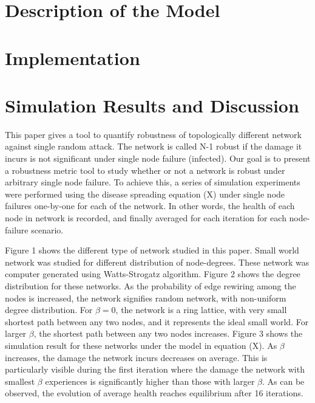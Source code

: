 \documentclass[11pt]{article}
\begin{document}
\section{Description of the Model}

\section{Implementation}

\newpage
\section{Simulation Results and Discussion}
This paper gives a tool to quantify robustness of topologically different network against single random attack. The network is called N-1 robust if the damage it incurs is not significant under single node failure (infected). Our goal is to present a robustness metric tool to study whether or not a network is robust under arbitrary single node failure. To achieve this, a series of simulation experiments were performed using the disease spreading equation (X) under single node failures one-by-one for each of the network. In other words, the health of each node in network is recorded, and finally averaged for each iteration for each node-failure scenario. 

Figure 1 shows the different type of network studied in this paper. Small world network was studied for different distribution of node-degrees. These network was computer generated using Watts-Strogatz algorithm. Figure 2 shows the degree distribution for these networks. As the probability of edge rewiring among the nodes is increased, the network signifies random network, with non-uniform degree distribution. For $\beta=0$, the network is a ring lattice, with very small shortest path between any two nodes, and it represents the ideal small world. For larger $\beta$, the shortest path between any two nodes increases. Figure 3 shows the simulation result for these networks under the model in equation (X). As $\beta$ increases, the damage the network incurs decreases on average. This is particularly visible during the first iteration where the damage the network with smallest $\beta$ experiences is significantly higher than those with larger $\beta$. As can be observed, the evolution of average health reaches equilibrium after 16 iterations. 
\end{document}
